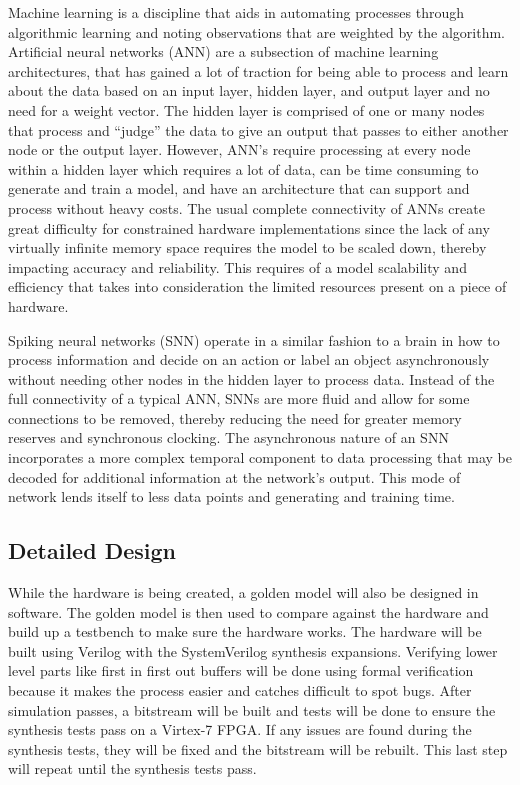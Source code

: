 \documentclass[12pt,titlepage]{article}
\begin{document}
Machine learning is a discipline that aids in automating processes through algorithmic learning and noting observations that are weighted by the
algorithm. Artificial neural networks (ANN) are a subsection of machine learning architectures, that has gained a lot of traction for being able
to process and learn about the data based on an input layer, hidden layer, and output layer and no need for a weight vector. The hidden layer is
comprised of one or many nodes that process and “judge” the data to give an output that passes to either another node or the output layer. However,
ANN’s require processing at every node within a hidden layer which requires a lot of data, can be time consuming to generate and train a model,
and have an architecture that can support and process without heavy costs. The usual complete connectivity of ANNs create great difficulty for
constrained hardware implementations since the lack of any virtually infinite memory space requires the model to be scaled down, thereby impacting
accuracy and reliability. This requires of a model scalability and efficiency that takes into consideration the limited resources present on a piece
of hardware.

Spiking neural networks (SNN) operate in a similar fashion to a brain in how to process information and decide on an action or label an object
asynchronously without needing other nodes in the hidden layer to process data. Instead of the full connectivity of a typical ANN, SNNs are more
fluid and allow for some connections to be removed, thereby reducing the need for greater memory reserves and synchronous clocking. The asynchronous
nature of an SNN incorporates a more complex temporal component to data processing that may be decoded for additional information at the network’s
output. This mode of network lends itself to less data points and generating and training time.

\subsection{Detailed Design}
While the hardware is being created, a golden model will also be designed in software. The golden model is then used to compare against the hardware and
build up a testbench to make sure the hardware works. The hardware will be built using Verilog with the SystemVerilog synthesis expansions. Verifying lower
level parts like first in first out buffers will be done using formal verification because it makes the process easier and catches difficult to spot bugs.
After simulation passes, a bitstream will be built and tests will be done to ensure the synthesis tests pass on a Virtex-7 FPGA. If any issues are found
during the synthesis tests, they will be fixed and the bitstream will be rebuilt. This last step will repeat until the synthesis tests pass.
\end{document}
